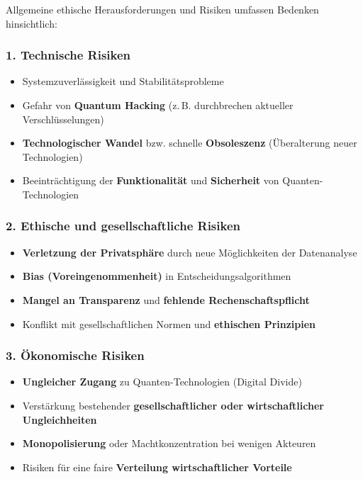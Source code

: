 Allgemeine ethische Herausforderungen und Risiken umfassen Bedenken hinsichtlich:

\subsubsection{\textbf{1. Technische Risiken}}
\begin{itemize}
    \item Systemzuverlässigkeit und Stabilitätsprobleme
    \item Gefahr von \textbf{Quantum Hacking} (z. B. durchbrechen aktueller Verschlüsselungen)
    \item \textbf{Technologischer Wandel} bzw. schnelle \textbf{Obsoleszenz} (Überalterung neuer Technologien)
    \item Beeinträchtigung der \textbf{Funktionalität} und \textbf{Sicherheit} von Quanten-Technologien
\end{itemize}

\subsubsection{\textbf{2. Ethische und gesellschaftliche Risiken}}
\begin{itemize}
    \item \textbf{Verletzung der Privatsphäre} durch neue Möglichkeiten der Datenanalyse
    \item \textbf{Bias (Voreingenommenheit)} in Entscheidungsalgorithmen
    \item \textbf{Mangel an Transparenz} und \textbf{fehlende Rechenschaftspflicht}
    \item Konflikt mit gesellschaftlichen Normen und \textbf{ethischen Prinzipien}
\end{itemize}

\subsubsection{\textbf{3. Ökonomische Risiken}}
\begin{itemize}
    \item \textbf{Ungleicher Zugang} zu Quanten-Technologien (Digital Divide)
    \item Verstärkung bestehender \textbf{gesellschaftlicher oder wirtschaftlicher Ungleichheiten}
    \item \textbf{Monopolisierung} oder Machtkonzentration bei wenigen Akteuren
    \item Risiken für eine faire \textbf{Verteilung wirtschaftlicher Vorteile}
\end{itemize}

